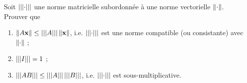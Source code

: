 Soit $\triple{\cdot}$ une norme matricielle subordonnée à une norme vectorielle $\norm{\cdot}$.
Prouver que

\begin{enumerate}
  \item $\norm{A \BoldX} \leq \triple{A} \norm{\BoldX}$, i.e. $\triple{\cdot}$ est une norme compatible (ou consistante) avec $\norm{\cdot}$ ;
  \item $\triple{I} = 1$ ;
  \item $\triple{A B} \leq \triple{A} \triple{B}$, i.e. $\triple{\cdot}$ est sous-multiplicative.
\end{enumerate}